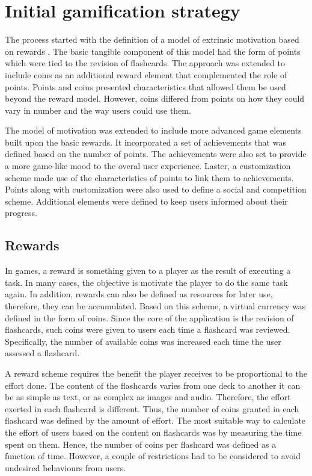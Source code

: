 \section{Initial gamification strategy}
\label{desi-gamification-strategy}
The process started with the definition of a model of extrinsic motivation based on rewards \citep{richter2015studying}. The basic tangible component of this model had the form of points which were tied to the revision of flashcards. The approach was extended to include coins as an additional reward element that complemented the role of points. Points and coins presented characteristics that allowed them be used beyond the reward model. However, coins differed from points on how they could vary in number and the way users could use them.

The model of motivation was extended to include more advanced game elements built upon the basic rewards. It incorporated a set of achievements that was defined based on the number of points. The achievements were also set to provide a more game-like mood to the overal user experience. Laster, a customization scheme made use of the characteristics of points to link them to achievements. Points along with customization were also used to define a social and competition scheme. Additional elements were defined to keep users informed about their progress.

\subsection{Rewards}
In games, a reward is something given to a player as the result of executing a task. In many cases, the objective is motivate the player to do the same task again. In addition, rewards can also be defined as resources for later use, therefore, they can be accumulated. Based on this scheme, a virtual currency was defined in the form of coins. Since the core of the application is the revision of flashcards, such coins were given to users each time a flashcard was reviewed. Specifically, the number of available coins was increased each time the user assessed a flashcard.

A reward scheme requires the benefit the player receives to be proportional to the effort done. The content of the flashcards varies from one deck to another it can be as simple as text, or as complex as images and audio. Therefore, the effort exerted in each flashcard is different. Thus, the number of coins granted in each flashcard was defined by the amount of effort. The most suitable way to calculate the effort of users based on the content on flashcards was by measuring the time spent on them. Hence, the number of coins per flashcard was defined as a function of time. However, a couple of restrictions had to be considered to avoid undesired behaviours from users.

